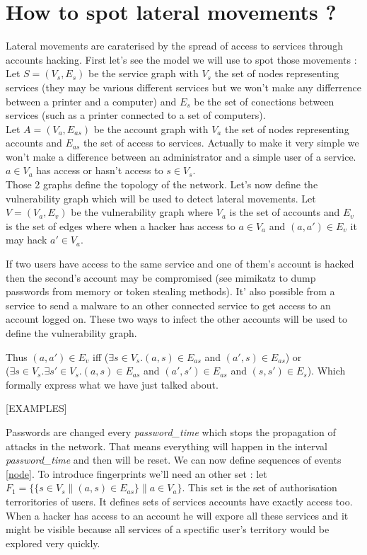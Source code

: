 \documentclass[11pt]{article}
\begin{document}
\section{How to spot lateral movements ?}
\indent Lateral movements are caraterised by the spread of access to services through accounts hacking. First let's see the model we will use to spot those movements :\\
\indent Let $S=(V_s,E_s)$ be the service graph with $V_s$ the set of nodes representing services (they may be various different services but we won't make any differrence between a printer and a computer) and $E_s$ be the set of conections between services (such as a printer connected to a set of computers).\\
\indent Let $A=(V_a,E_{as})$ be the account graph with $V_a$ the set of nodes representing accounts and $E_{as}$ the set of access to services. Actually to make it very simple we won't make a difference between an administrator and a simple user of a service. $a\in V_a$ has access or hasn't access to $s\in V_s$.\\
\indent Those 2 graphs define the topology of the network. Let's now define the vulnerability graph which will be used to detect lateral movements. Let $V=(V_a,E_v)$ be the vulnerability graph where $V_a$ is the set of accounts and $E_v$ is the set of edges where when a hacker has access to $a\in V_a$ and $(a,a')\in E_v$ it may hack $a'\in V_a$. 

If two users have access to the same service and one of them's account is hacked then the second's account may be compromised (see mimikatz to dump passwords from memory or token stealing methods). It' also possible from a service to send a malware to an other connected service to get access to an account logged on. These two ways to infect the other accounts will be used to define the vulnerability graph. 

Thus $(a,a')\in E_v$ iff ($\exists s\in V_s. (a,s)\in E_{as}$ and $(a',s)\in E_{as}$) or\\ ($\exists s\in V_s. \exists s'\in V_s. (a,s)\in E_{as}$ and $(a',s')\in E_{as}$ and $(s,s')\in E_s$). Which formally express what we have just talked about.

[EXAMPLES]

Passwords are changed every \textit{password\_time} which stops the propagation of attacks in the network. That means everything will happen in the interval \textit{password\_time} and then will be reset. We can now define sequences of events \ref{node}. To introduce fingerprints we'll need an other set : let $F_1 = \{ \{s\in V_s \| (a,s) \in E_{as}\} \| a\in V_a\}$. This set is the set of authorisation terroritories of users. It defines sets of services accounts have exactly access too. When a hacker has access to an account he will expore all these services and it might be visible because all services of a spectific user's territory would be explored very quickly.
\end{document}
